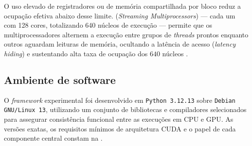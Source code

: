 \begin{enumerate}
{            O uso elevado de registradores ou de memória compartilhada por bloco reduz a ocupação efetiva abaixo desse limite.}
            (\emph{Streaming Multiprocessors}) --- cada um com 128 cores, totalizando 640 núcleos de execução --- permite que os multiprocessadores alternem a execução entre grupos de \emph{threads} prontos enquanto outros aguardam leituras de memória, ocultando a latência de acesso (\emph{latency hiding}) e sustentando alta taxa de ocupação dos \(640\) núcleos \autocite{kirk2010programming}.
\end{enumerate}

\subsection{Ambiente de software}\label{sec-312-ambiente-software}

O \emph{framework} experimental foi desenvolvido em \texttt{Python 3.12.13} sobre \texttt{Debian GNU/Linux 13}, utilizando um conjunto de bibliotecas e compiladores selecionados para assegurar consistência funcional entre as execuções em CPU e GPU.
As versões exatas, os requisitos mínimos de arquitetura CUDA e o papel de cada componente central constam na .


